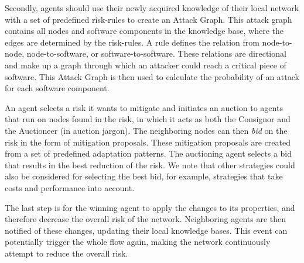 Secondly, agents should use their newly acquired knowledge of their local network with a set of predefined risk-rules to create an Attack Graph. This attack graph contains all nodes and software components in the knowledge base, where the edges are determined by the risk-rules. A rule defines the relation from node-to-node, node-to-software, or software-to-software. These relations are directional and make up a graph through which an attacker could reach a critical piece of software. This Attack Graph is then used to calculate the probability of an attack for each software component. 

An agent selects a risk it wants to mitigate and initiates an auction to agents that run on nodes found in the risk, in which it acts as both the Consignor and the Auctioneer (in auction jargon). The neighboring nodes can then \emph{bid} on the risk in the form of mitigation proposals. These mitigation proposals are created from a set of predefined adaptation patterns. The auctioning agent selects a bid that results in the best reduction of the risk. We note that other strategies could also be considered for selecting the best bid, for example, strategies that take costs and performance into account.

The last step is for the winning agent to apply the changes to its properties, and therefore decrease the overall risk of the network. Neighboring agents are then notified of these changes, updating their local knowledge bases. This event can potentially trigger the whole flow again, making the network continuously attempt to reduce the overall risk.

